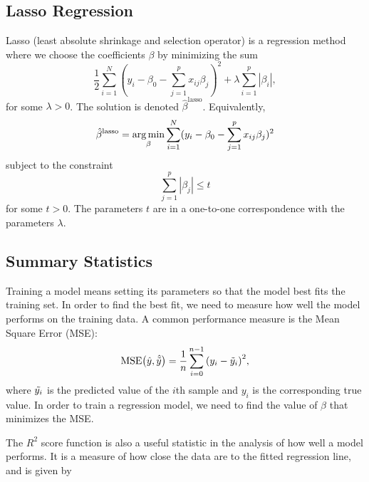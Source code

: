\subsection{Lasso Regression}\label{sec:Lasso theory}
Lasso (least absolute shrinkage and selection operator) is a regression method where we choose the coefficients $\beta$ by minimizing the sum
\begin{equation}\label{eq:lasso}
    \frac12\sum_{i=1}^N(y_i-\beta_0-\sum_{j=1}^px_{ij}\beta_j)^2+\lambda\sum_{i=1}^p|\beta_i|,
\end{equation}
for some $\lambda > 0$. The solution is denoted $\hat{\beta}^{\text{lasso}}$. Equivalently,
\begin{equation*}
    \hat{\beta}^{\text{lasso}} = \operatorname*{arg\,min}_\beta \sum_{i=1}^N(y_i-\beta_0-\sum_{j=1}^px_{ij}\beta_j)^2
\end{equation*}
subject to the constraint
\begin{equation*}
    \sum_{j=1}^p|\beta_j|\le t
\end{equation*}
for some $t>0$. The parameters $t$ are in a one-to-one correspondence with the parameters $\lambda$.

\subsection{Summary Statistics}\label{sec:SummaryStat theory}
Training a model means setting its parameters so that the model best fits the training set. In order to find the best fit, we need to measure how well the model performs on the training data. A common performance measure is the Mean Square Error (MSE)\cite[109]{Hands-onML}: 
\begin{equation}\label{eq:MSE}
    \mathrm{MSE} \qty(\hat{y}, \hat{\Tilde{y}})= \frac{1}{n} \sum_{i=0}^{n-1} \qty(y_i - \Tilde{y}_i)^2,
\end{equation}
where $\Tilde{y_i}$ is the predicted value of the $i$th sample and $y_i$ is the corresponding true value. In order to train a regression model, we need to find the value of $\beta$ that minimizes the MSE.

The $R^2$ score function is also a useful statistic in the analysis of how well a model performs. It is a measure of how close the data are to the fitted regression line, and is given by

